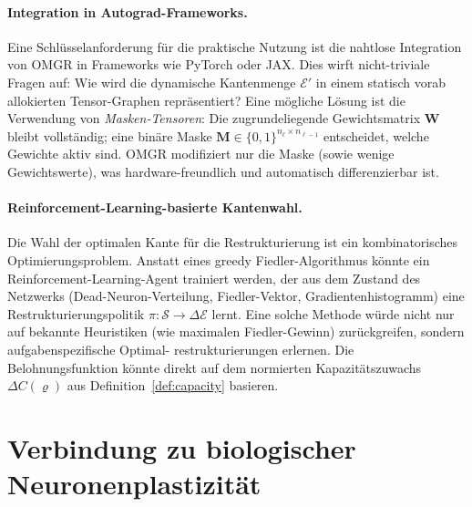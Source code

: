 ﻿\documentclass[12pt, a4paper, openany]{report}
\newcommand{\calE}{\mathcal{E}}
\begin{document}
\paragraph{Integration in Autograd-Frameworks.}
Eine Schlüsselanforderung für die praktische Nutzung ist die nahtlose
Integration von OMGR in Frameworks wie PyTorch oder JAX.  Dies wirft
nicht-triviale Fragen auf: Wie wird die dynamische Kantenmenge $\calE'$
in einem statisch vorab allokierten Tensor-Graphen repräsentiert?
Eine mögliche Lösung ist die Verwendung von \emph{Masken-Tensoren}: Die
zugrundeliegende Gewichtsmatrix $\bm{W}$ bleibt vollständig; eine binäre
Maske $\bm{M} \in \{0,1\}^{n_\ell \times n_{\ell-1}}$ entscheidet, welche
Gewichte aktiv sind.  OMGR modifiziert nur die Maske (sowie wenige
Gewichtswerte), was hardware-freundlich und automatisch differenzierbar ist.

\paragraph{Reinforcement-Learning-basierte Kantenwahl.}
Die Wahl der optimalen Kante für die Restrukturierung ist ein kombinatorisches
Optimierungsproblem.  Anstatt eines greedy Fiedler-Algorithmus könnte ein
Reinforcement-Learning-Agent trainiert werden, der aus dem Zustand des
Netzwerks (Dead-Neuron-Verteilung, Fiedler-Vektor, Gradientenhistogramm)
eine Restrukturierungspolitik $\pi : \mathcal{S} \to \Delta\calE$ lernt.
Eine solche Methode würde nicht nur auf bekannte Heuristiken (wie maximalen
Fiedler-Gewinn) zurückgreifen, sondern aufgabenspezifische Optimal-
restrukturierungen erlernen.  Die Belohnungsfunktion könnte direkt auf
dem normierten Kapazitätszuwachs $\Delta C(\varrho)$ aus Definition~\ref{def:capacity}
basieren.

\section{Verbindung zu biologischer Neuronenplastizität}
\label{sec:outlook_bio}
\end{document}
